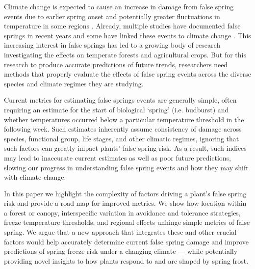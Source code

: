 \documentclass{article}\usepackage[]{graphicx}\usepackage[]{color}
\begin{document}
Climate change is expected to cause an increase in damage from false spring events due to earlier spring onset and potentially greater fluctuations in temperature in some regions \citep{Inouye2008, Martin2010}. Already, multiple studies have documented false springs in recent years \citep{Gu2008, Augspurger2009, Augspurger2013, Menzel2015} and some have linked these events to climate change \citep{Ault2013, Allstadt2015, Muffler2016, Xin2016, Vitra2017}. This increasing interest in false springs has led to a growing body of research investigating the effects on temperate forests and agricultural crops. But for this research to produce accurate predictions of future trends, researchers need methods that properly evaluate the effects of false spring events across the diverse species and climate regimes they are studying. 

Current metrics for estimating false springs events are generally simple, often requiring an estimate for the start of biological `spring' (i.e. budburst) and whether temperatures occurred below a particular temperature threshold in the following week. Such estimates inherently assume consistency of damage across species, functional group, life stages, and other climatic regimes, ignoring that such factors can greatly impact plants' false spring risk. As a result, such indices may lead to inaccurate current estimates as well as poor future predictions, slowing our progress in understanding false spring events and how they may shift with climate change. 

In this paper we highlight the complexity of factors driving a plant's false spring risk and provide a road map for improved metrics. We show how location within a forest or canopy, interspecific variation in avoidance and tolerance strategies, freeze temperature thresholds, and regional effects unhinge simple metrics of false spring. We argue that a new approach that integrates these and other crucial factors would help accurately determine current false spring damage and improve predictions of spring freeze risk under a changing climate --- while potentially providing novel insights to how plants respond to and are shaped by spring frost. %
\end{document}
